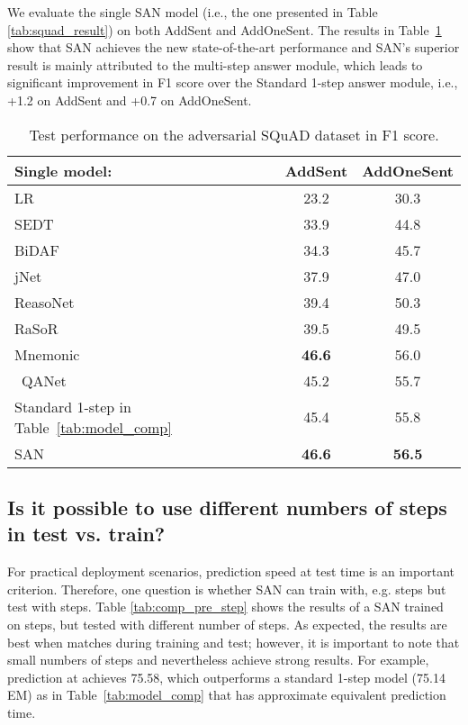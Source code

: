 \documentclass[11pt,a4paper]{article}
\begin{document}
We evaluate the single SAN model (i.e., the one presented in Table \ref{tab:squad_result}) on both AddSent and AddOneSent. The results in Table~\ref{tab:adversial_data} show that SAN achieves the new state-of-the-art performance and SAN's superior result is mainly attributed to the multi-step answer module, which leads to significant improvement in F1 score over the Standard 1-step answer module, i.e., +1.2 on AddSent and +0.7 on AddOneSent.



\begin{table}[t]
\centering
\begin{tabular}{@{\hskip1pt}l @{\hskip1pt}||@{\hskip1pt} c @{\hskip1pt}| @{\hskip1pt}c @{\hskip1pt} }
\hline
Single model:&AddSent& AddOneSent \\ \hline
\hline
LR \cite{rajpurkar2016squad} &23.2 &30.3 \\ \hline
SEDT \cite{liu2017structural} &33.9 & 44.8 \\ \hline
BiDAF \cite{seo2016bidirectional}&34.3 & 45.7 \\ \hline
jNet \cite{zhang2017exploring}&37.9 &47.0\\ \hline
ReasoNet\cite{shen2017empirical} & 39.4& 50.3 \\ \hline
RaSoR\cite{lee2016learning} &39.5 &49.5\\ \hline
Mnemonic\cite{hu2017mnemonic} & \textbf{46.6}& 56.0\\\hline \
QANet\cite{yu18qanet} &45.2 &55.7 \\ \hline \hline
Standard 1-step in Table~\ref{tab:model_comp} &45.4& 55.8\\ \hline
SAN &\textbf{46.6}& \textbf{56.5}\\ \hline
\end{tabular}
\caption{\label{tab:adversial_data} Test performance on the adversarial SQuAD dataset in F1 score.}
\end{table}


\subsection{Is it possible to use different numbers of steps in test vs. train?} 
For practical deployment scenarios, prediction speed at test time is an important criterion.
Therefore, one question is whether SAN can train with, e.g.  steps but test with  steps. 
Table \ref{tab:comp_pre_step} shows the results of a SAN trained on  steps, but tested with different number of steps. 
As expected, the results are best when  matches during training and test; however, it is important to note that small numbers of steps  and  nevertheless achieve strong results.
For example, prediction at  achieves 75.58, which outperforms a standard 1-step model (75.14 EM) as in Table~\ref{tab:model_comp} that has approximate equivalent prediction time. 
\end{document}
